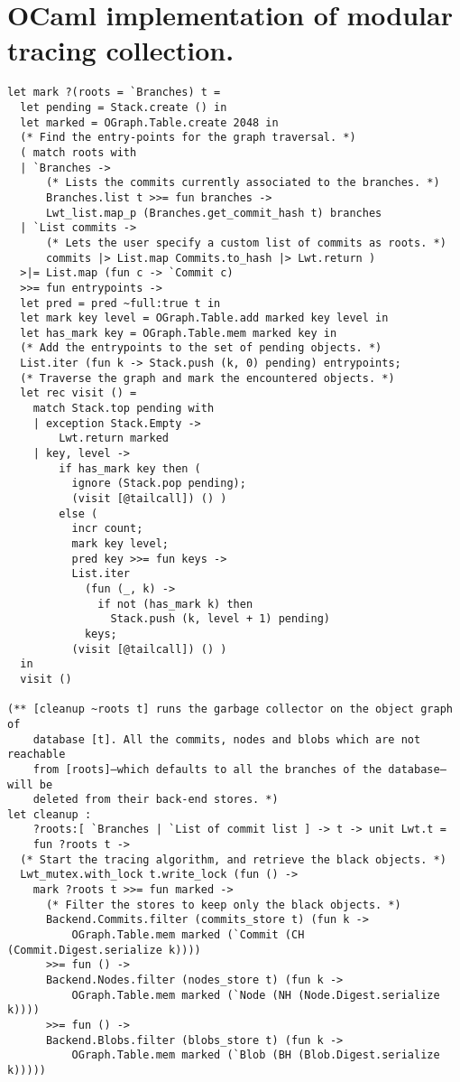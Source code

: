 \section{OCaml implementation of modular tracing collection.}
\label{app:modular-tracing}

\begin{verbatim}
let mark ?(roots = `Branches) t =
  let pending = Stack.create () in
  let marked = OGraph.Table.create 2048 in
  (* Find the entry-points for the graph traversal. *)
  ( match roots with
  | `Branches ->
      (* Lists the commits currently associated to the branches. *)
      Branches.list t >>= fun branches ->
      Lwt_list.map_p (Branches.get_commit_hash t) branches
  | `List commits ->
      (* Lets the user specify a custom list of commits as roots. *)
      commits |> List.map Commits.to_hash |> Lwt.return )
  >|= List.map (fun c -> `Commit c)
  >>= fun entrypoints ->
  let pred = pred ~full:true t in
  let mark key level = OGraph.Table.add marked key level in
  let has_mark key = OGraph.Table.mem marked key in
  (* Add the entrypoints to the set of pending objects. *)
  List.iter (fun k -> Stack.push (k, 0) pending) entrypoints;
  (* Traverse the graph and mark the encountered objects. *)
  let rec visit () =
    match Stack.top pending with
    | exception Stack.Empty ->
        Lwt.return marked
    | key, level ->
        if has_mark key then (
          ignore (Stack.pop pending);
          (visit [@tailcall]) () )
        else (
          incr count;
          mark key level;
          pred key >>= fun keys ->
          List.iter
            (fun (_, k) ->
              if not (has_mark k) then
                Stack.push (k, level + 1) pending)
            keys;
          (visit [@tailcall]) () )
  in
  visit ()

(** [cleanup ~roots t] runs the garbage collector on the object graph of
    database [t]. All the commits, nodes and blobs which are not reachable
    from [roots]–which defaults to all the branches of the database–will be
    deleted from their back-end stores. *)
let cleanup :
    ?roots:[ `Branches | `List of commit list ] -> t -> unit Lwt.t =
    fun ?roots t ->
  (* Start the tracing algorithm, and retrieve the black objects. *)
  Lwt_mutex.with_lock t.write_lock (fun () ->
    mark ?roots t >>= fun marked ->
      (* Filter the stores to keep only the black objects. *)
      Backend.Commits.filter (commits_store t) (fun k ->
          OGraph.Table.mem marked (`Commit (CH (Commit.Digest.serialize k))))
      >>= fun () ->
      Backend.Nodes.filter (nodes_store t) (fun k ->
          OGraph.Table.mem marked (`Node (NH (Node.Digest.serialize k))))
      >>= fun () ->
      Backend.Blobs.filter (blobs_store t) (fun k ->
          OGraph.Table.mem marked (`Blob (BH (Blob.Digest.serialize k)))))
\end{verbatim}
